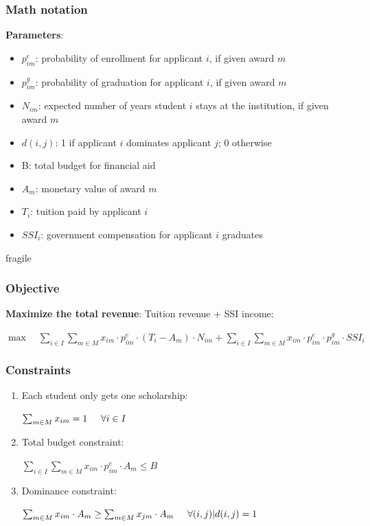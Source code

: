 \documentclass[aspectratio=169]{beamer}
\begin{document}
\begin{frame}
\frametitle{Math notation}

\textbf{Parameters}:
\begin{itemize}
\item $p^e_{im}$: \hspace{0.3cm}  probability of enrollment for applicant 
$i$, if given award $m$
\item $p^g_{im}$: \hspace{0.3cm}  probability of graduation for applicant 
$i$, if given award $m$ 
\item $N_{im}$: \hspace{0.25cm} expected number of years student $i$ 
stays at the institution, if given award $m$
\item $d(i,j)$:\hspace{0.1cm} 1 if applicant $i$ dominates 
applicant $j$; 0 otherwise
\item B:       \hspace{0.3cm} total budget for financial aid
\item $A_m$: \hspace{0.01cm} monetary value of award $m$
\item $T_i$:  \hspace{0.2cm} tuition paid by applicant $i$
\item $SSI_i$:\hspace{0cm} government compensation for
				applicant $i$ graduates

\end{itemize}
\end{frame}




\begin{frame}{fragile}
\frametitle{Objective}
\textbf{Maximize the total revenue}: Tuition revenue + SSI 
income:

\scriptsize{
$\max \quad \sum_{i\in I} \sum_{m\in M} x_{im}\cdot p^e_{im}\cdot(T_i-A_m)\cdot
N_{im}+
\sum_{i\in I} \sum_{m\in M} x_{im}\cdot p^e_{im} \cdot p^g_{im}\cdot SSI_i$

}


\end{frame}


\begin{frame}
\frametitle{Constraints}
\begin{enumerate}
\item Each student only gets one scholarship:

 $\sum_{m \in 
M}x_{im}=1  \hspace{0.5cm} \forall i\in I $
\vfill
\item Total budget constraint: 

$\sum_{i \in I} \sum_{m\in M} 
x_{im}\cdot p^e_{im}\cdot A_m\leq B $
\vfill
\item Dominance constraint:

$ \sum_{m \in M} x_{im}\cdot A_m \geq \sum_{m \in M} 
x_{jm}\cdot A_m \hspace{0.5cm}  \forall
(i,j)|d(i,j)=1 $

\end{enumerate}
\end{frame}
\end{document}
